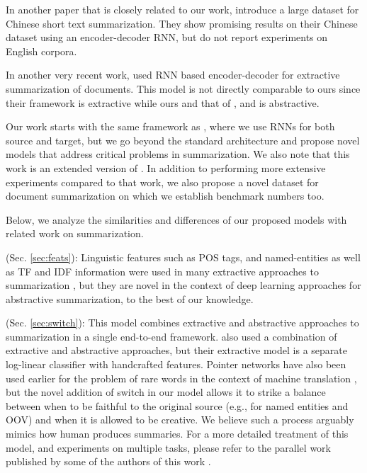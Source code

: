 In another paper that is closely related to our work,  introduce a large dataset for Chinese short text summarization. They show promising results on their Chinese dataset using an encoder-decoder RNN, but do not report experiments on English corpora. 

In another very recent work,  used RNN based encoder-decoder for extractive summarization of documents. This model is not directly comparable to ours since their framework is extractive while ours and that of \cite{namas}, \cite{hu:2015:EMNLP} and \cite{chopra} is abstractive.

Our work starts with the same framework as \cite{hu:2015:EMNLP}, where we use RNNs for both source and target, but we go beyond the standard architecture and propose novel models that address critical problems in summarization. We also note that this work is an extended version of . In addition to performing more extensive experiments compared to that work, we also propose a novel dataset for document summarization on which we establish benchmark numbers too.

Below, we analyze the similarities and differences of our proposed models with related work on summarization.

 (Sec. \ref{sec:feats}): Linguistic features such as POS tags, and named-entities as well as TF and IDF information were used in many extractive approaches to summarization \cite{linguistic_extractive}, but they are novel in the context of deep learning approaches for abstractive summarization, to the best of our knowledge.

 (Sec. \ref{sec:switch}): This model combines extractive and abstractive approaches to summarization in a single end-to-end framework.  also used a combination of extractive and abstractive approaches, but their extractive model is a separate log-linear classifier with handcrafted features. Pointer networks \cite{pointer_networks} have also been used earlier for the problem of rare words in the context of machine translation \cite{luongACL15}, but the novel addition of switch in our model allows it to strike a balance between when to be faithful to the original source (e.g., for named entities and OOV) and when it is allowed to be creative. We believe such a process arguably mimics how human produces summaries. For a more detailed treatment of this model, and experiments on multiple tasks, please refer to the parallel work published by some of the authors of this work \cite{caglar_acl}.

